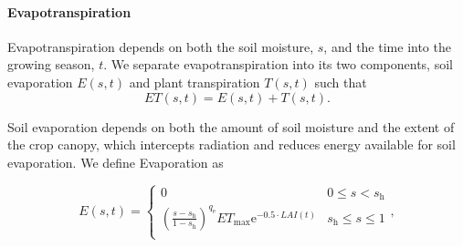 


\paragraph{Evapotranspiration}

Evapotranspiration depends on both the soil moisture, $s$, and the time into the growing season, $t$. We separate evapotranspiration into its two components, soil evaporation $E(s,t)$ and plant transpiration $T(s,t)$ such that
\begin{equation}
\label{eq:ET1}
    ET(s,t) = E(s,t) + T(s,t).
\end{equation}

\noindent
Soil evaporation depends on both the amount of soil moisture and the extent of the crop canopy, which intercepts radiation and reduces energy available for soil evaporation. We define Evaporation as 

\begin{equation}
\label{eq:E}
    E(s,t) = \begin{cases}
        0   &   0 \leq s < s_{\text{h}}  \\
        \left( \frac{s-s_{\text{h}}}{1-s_{\text{h}}} \right) ^{q_{\text{e}}} ET_{\text{max}} \mathrm{e}^{-0.5 \cdot LAI(t)}  &   s_{\text{h}} \leq s \leq 1 \\
    \end{cases},
\end{equation}

